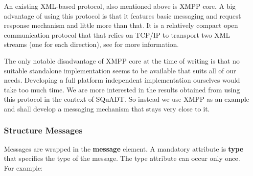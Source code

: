 \documentclass{article}
\newcommand{\squadt}{SQuADT\xspace}
\begin{document}
   An existing XML-based protocol, also mentioned above is XMPP core.  A big
   advantage of using this protocol is that it features basic messaging and
   request response mechanism and little more than that. It is a relatively
   compact open communication protocol that that relies on TCP/IP to transport
   two XML streams (one for each direction), see \cite{Sperberg-McQueen:06:EML}
   for more information.

   The only notable disadvantage of XMPP core at the time of writing is that no
   suitable standalone implementation seems to be available that suits all of
   our needs.  Developing a full platform independent implementation ourselves
   would take too much time. We are more interested in the results obtained
   from using this protocol in the context of \squadt. So instead we use XMPP as
   an example and shall develop a messaging mechanism that stays very close to it.



   \subsubsection{Structure Messages} \label{ss:structure}

    \noindent Messages are wrapped in the \textbf{message} element. A mandatory
    attribute is \textbf{type} that specifies the type of the message. The type
    attribute can occur only once. For example:
 
\end{document}
